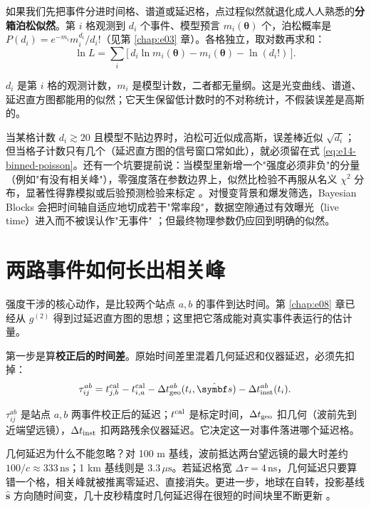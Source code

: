 如果我们先把事件分进时间格、谱道或延迟格，点过程似然就退化成人人熟悉的\textbf{分箱泊松似然}。第 \(i\) 格观测到 \(d_i\) 个事件、模型预言 \(m_i(\bm\theta)\) 个，泊松概率是 \(P(d_i)=e^{-m_i}m_i^{d_i}/d_i!\)（见第 \ref{chap:e03} 章）。各格独立，取对数再求和：
\begin{equation}
  \ln L
  =\sum_i\Big[\,d_i\ln m_i(\bm\theta)-m_i(\bm\theta)-\ln(d_i!)\,\Big] .
  \label{eq:e14-binned-poisson}
\end{equation}
\begin{formulaexplain}
\(d_i\) 是第 \(i\) 格的观测计数，\(m_i\) 是模型计数，二者都无量纲。这是光变曲线、谱道、延迟直方图都能用的似然；它天生保留低计数时的不对称统计，不假装误差是高斯的。
\end{formulaexplain}
当某格计数 \(d_i\gtrsim20\) 且模型不贴边界时，泊松可近似成高斯，误差棒近似 \(\sqrt{d_i}\)；但当格子计数只有几个（延迟直方图的信号窗口常如此），就必须留在式 \eqref{eq:e14-binned-poisson}。还有一个坑要提前说：当模型里新增一个"强度必须非负"的分量（例如"有没有相关峰"），零强度落在参数边界上，似然比检验不再服从名义 \(\chi^2\) 分布，显著性得靠模拟或后验预测检验来标定 \citep{2002ApJ...571..545P}。对慢变背景和爆发筛选，Bayesian Blocks 会把时间轴自适应地切成若干"常率段"，数据空隙通过有效曝光（live time）进入而不被误认作"无事件" \citep{2013ApJ...764..167S}；但最终物理参数仍应回到明确的似然。

\section{两路事件如何长出相关峰}
\label{sec:e14-corr}

强度干涉的核心动作，是比较两个站点 \(a,b\) 的事件到达时间。第 \ref{chap:e08} 章已经从 \(g^{(2)}\) 得到过延迟直方图的思想；这里把它落成能对真实事件表运行的估计量。

第一步是算\textbf{校正后的时间差}。原始时间差里混着几何延迟和仪器延迟，必须先扣掉：
\begin{equation}
  \tau_{ij}^{ab}
  =
  t_{j,b}^{\rm cal}-t_{i,a}^{\rm cal}
  -\Delta t_{\rm geo}^{ab}(t_i,\hat{\bm s})
  -\Delta t_{\rm inst}^{ab}(t_i) .
  \label{eq:e14-delay}
\end{equation}
\begin{formulaexplain}
\(\tau_{ij}^{ab}\) 是站点 \(a,b\) 两事件校正后的延迟；\(t^{\rm cal}\) 是标定时间，\(\Delta t_{\rm geo}\) 扣几何（波前先到近端望远镜），\(\Delta t_{\rm inst}\) 扣两路残余仪器延迟。它决定这一对事件落进哪个延迟格。
\end{formulaexplain}
几何延迟为什么不能忽略？对 100 m 基线，波前抵达两台望远镜的最大时差约 \(100/c\approx333\,\mathrm{ns}\)；1 km 基线则是 \(3.3\,\mu\mathrm{s}\)。若延迟格宽 \(\Delta\tau=4\,\mathrm{ns}\)，几何延迟只要算错一个格，相关峰就被推离零延迟、直接消失。更进一步，地球在自转，投影基线 \(\hat{\bm s}\) 方向随时间变，几十皮秒精度时几何延迟得在很短的时间块里不断更新 \citep{2006MNRAS.369..655H,2006MNRAS.372.1549E,2018RNAAS...2....4K,2020NatAs...4.1164A}。

